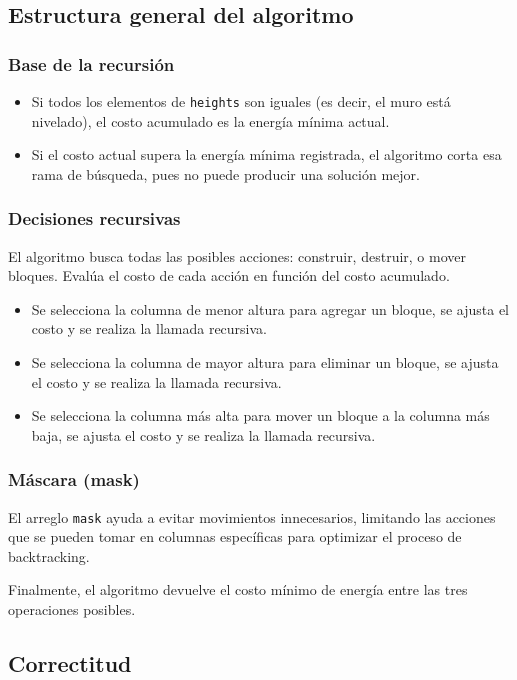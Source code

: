 \documentclass[a4paper,12pt]{article}
\begin{document}
\subsection{Estructura general del algoritmo}

\subsubsection{Base de la recursión}
\begin{itemize}
	\item Si todos los elementos de \texttt{heights} son iguales (es decir, el muro está nivelado), el costo acumulado es la energía mínima actual.
	\item Si el costo actual supera la energía mínima registrada, el algoritmo corta esa rama de búsqueda, pues no puede producir una solución mejor.
\end{itemize}

\subsubsection{Decisiones recursivas}
El algoritmo busca todas las posibles acciones: construir, destruir, o mover bloques. Evalúa el costo de cada acción en función del costo acumulado.
\begin{itemize}
	\item Se selecciona la columna de menor altura para agregar un bloque, se ajusta el costo y se realiza la llamada recursiva.
	\item Se selecciona la columna de mayor altura para eliminar un bloque, se ajusta el costo y se realiza la llamada recursiva.
	\item Se selecciona la columna más alta para mover un bloque a la columna más baja, se ajusta el costo y se realiza la llamada recursiva.
\end{itemize}

\subsubsection{Máscara (mask)}
El arreglo \texttt{mask} ayuda a evitar movimientos innecesarios, limitando las acciones que se pueden tomar en columnas específicas para optimizar el proceso de backtracking.

Finalmente, el algoritmo devuelve el costo mínimo de energía entre las tres operaciones posibles.

\subsection{Correctitud}
\end{document}
